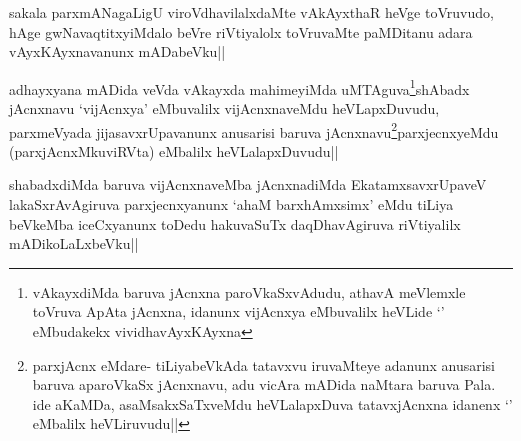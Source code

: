 
\begin{artha}
sakala parxmANagaLigU viroVdhavilalxdaMte vAkAyxthaR heVge toVruvudo, hAge gwNavaqtitxyiMdalo beVre riVtiyalolx toVruvaMte paMDitanu adara vAyxKAyxnavanunx mADabeVku||
\end{artha}


\begin{artha}
adhayxyana mADida veVda vAkayxda mahimeyiMda uMTAguva\footnote{vAkayxdiMda baruva jAcnxna paroVkaSxvAdudu, athavA meVlemxle toVruva ApAta jAcnxna, idanunx vijAcnxya eMbuvalilx heVLide `\stext' eMbudakekx vividhavAyxKAyxna}shAbadx jAcnxnavu `vijAcnxya' eMbuvalilx vijAcnxnaveMdu heVLapxDuvudu, parxmeVyada jijasavxrUpavanunx anusarisi baruva jAcnxnavu\footnote{parxjAcnx eMdare- tiLiyabeVkAda tatavxvu iruvaMteye adanunx anusarisi baruva aparoVkaSx jAcnxnavu, adu vicAra mADida naMtara baruva Pala. ide aKaMDa, asaMsakxSaTxveMdu heVLalapxDuva tatavxjAcnxna idanenx `\stext' eMbalilx heVLiruvudu||}parxjecnxyeMdu (parxjAcnxMkuviRVta) eMbalilx heVLalapxDuvudu||
\end{artha}


\begin{artha}
shabadxdiMda baruva vijAcnxnaveMba jAcnxnadiMda EkatamxsavxrUpaveV lakaSxrAvAgiruva parxjecnxyanunx `ahaM barxhAmxsimx' eMdu tiLiya beVkeMba iceCxyanunx toDedu hakuvaSuTx daqDhavAgiruva riVtiyalilx mADikoLaLxbeVku||
\end{artha}


